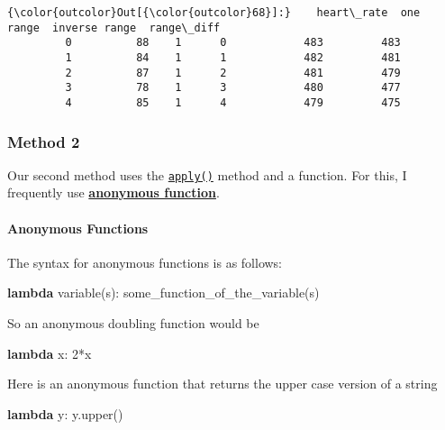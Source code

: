 \documentclass[11pt]{article}
\newenvironment{Shaded}{}{}
\newcommand{\KeywordTok}[1]{\textcolor[rgb]{0.00,0.44,0.13}{\textbf{{#1}}}}
\newcommand{\DecValTok}[1]{\textcolor[rgb]{0.25,0.63,0.44}{{#1}}}
\newcommand{\NormalTok}[1]{{#1}}
\newcommand{\OperatorTok}[1]{\textcolor[rgb]{0.40,0.40,0.40}{{#1}}}
\begin{document}
\begin{Verbatim}[commandchars=\\\{\}]
{\color{outcolor}Out[{\color{outcolor}68}]:}    heart\_rate  one  range  inverse range  range\_diff
         0          88    1      0            483         483
         1          84    1      1            482         481
         2          87    1      2            481         479
         3          78    1      3            480         477
         4          85    1      4            479         475
\end{Verbatim}
            
    \hypertarget{method-2}{%
\subsubsection{Method 2}\label{method-2}}

Our second method uses the \href{}{\texttt{apply()}} method and a
function. For this, I frequently use
\href{https://docs.python.org/3/tutorial/controlflow.html\#lambda-expressions}{\textbf{anonymous
function}}.

\hypertarget{anonymous-functions}{%
\paragraph{Anonymous Functions}\label{anonymous-functions}}

The syntax for anonymous functions is as follows:

\begin{Shaded}
\begin{Highlighting}[]
\KeywordTok{lambda}\NormalTok{ variable(s): some_function_of_the_variable(s)}
\end{Highlighting}
\end{Shaded}

So an anonymous doubling function would be

\begin{Shaded}
\begin{Highlighting}[]
\KeywordTok{lambda}\NormalTok{ x: }\DecValTok{2}\OperatorTok{*}\NormalTok{x}
\end{Highlighting}
\end{Shaded}

Here is an anonymous function that returns the upper case version of a
string

\begin{Shaded}
\begin{Highlighting}[]
\KeywordTok{lambda}\NormalTok{ y: y.upper()}
\end{Highlighting}
\end{Shaded}
\end{document}
